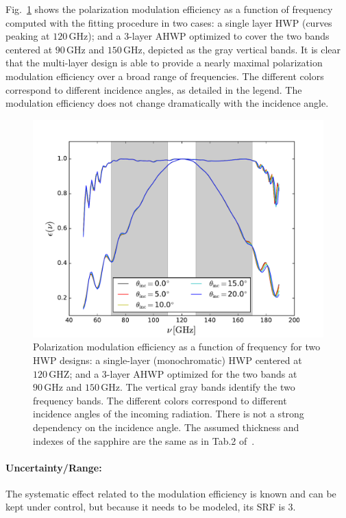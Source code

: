 Fig.~\ref{fig:eff} shows the polarization modulation efficiency as a function of frequency computed with the fitting procedure in two cases: a single layer HWP (curves peaking at $120\,\mathrm{GHz}$); and a 3-layer AHWP optimized to cover the two bands centered at $90\,\mathrm{GHz}$ and $150\,\mathrm{GHz}$, depicted as the gray vertical bands. It is clear that the multi-layer design is able to provide a nearly maximal polarization modulation efficiency over a broad range of frequencies. 
The different colors correspond to different incidence angles, as detailed in the legend. The modulation efficiency does not change dramatically with the incidence angle.

\begin{figure}
\begin{center}
\includegraphics{figures/Eps_vs_nu_3l_PB2.pdf}
\end{center}
\caption{Polarization modulation efficiency as a function of frequency for two HWP designs: a single-layer (monochromatic) HWP centered at $120\,\mathrm{GHZ}$; and a 3-layer AHWP optimized for the two bands at $90\,\mathrm{GHz}$ and $150\,\mathrm{GHz}$. The vertical gray bands identify the two frequency bands. The different colors correspond to different incidence angles of the incoming radiation. There is not a strong dependency on the incidence angle. The assumed thickness and indexes of the sapphire are the same as in Tab.2 of~\cite{PB2a_WHWP}.}\label{fig:eff}
\end{figure}


\paragraph{Uncertainty/Range:}
The systematic effect related to the modulation efficiency is known and can be kept under control, but because it needs to be modeled, its SRF is 3.

